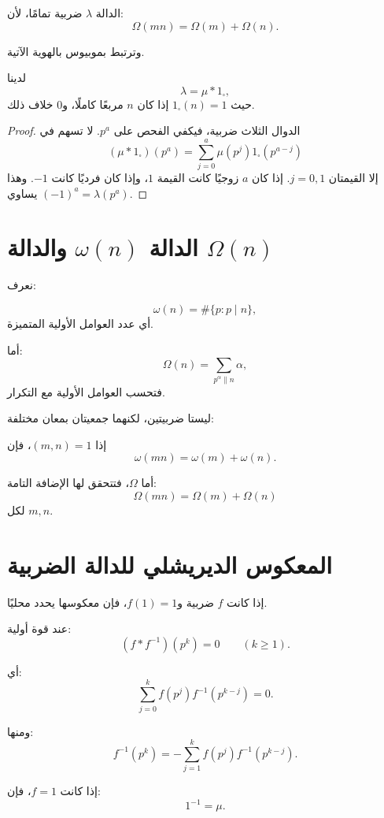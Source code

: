 الدالة \(\lambda\) ضربية تمامًا، لأن:
\[
\Omega(mn)=\Omega(m)+\Omega(n).
\]

وترتبط بموبيوس بالهوية الآتية.

\begin{proposition}
\label{prop:liouville-mobius-square}
\provedhere
لدينا
\[
\lambda
=
\mu*1_{\square},
\]
حيث \(1_{\square}(n)=1\) إذا كان \(n\) مربعًا كاملًا، و\(0\) خلاف ذلك.
\end{proposition}

\begin{proof}
الدوال الثلاث ضربية، فيكفي الفحص على \(p^a\). لا تسهم في
\[
(\mu*1_{\square})(p^a)
=
\sum_{j=0}^{a}\mu(p^j)1_{\square}(p^{a-j})
\]
إلا القيمتان \(j=0,1\). إذا كان \(a\) زوجيًا كانت القيمة \(1\)،
وإذا كان فرديًا كانت \(-1\). وهذا يساوي \((-1)^a=\lambda(p^a)\).
\end{proof}

\section{الدالة \(\omega(n)\) والدالة \(\Omega(n)\)}

نعرف:

\[
\omega(n)=\#\{p:p\mid n\},
\]
أي عدد العوامل الأولية المتميزة.

أما:
\[
\Omega(n)=\sum_{p^\alpha\parallel n}\alpha,
\]
فتحسب العوامل الأولية مع التكرار.

ليستا ضربيتين، لكنهما جمعيتان بمعان مختلفة:

إذا \((m,n)=1\)، فإن
\[
\omega(mn)=\omega(m)+\omega(n).
\]

أما \(\Omega\)، فتتحقق لها الإضافة التامة:
\[
\Omega(mn)=\Omega(m)+\Omega(n)
\]
لكل \(m,n\).

\section{المعكوس الديريشلي للدالة الضربية}

إذا كانت \(f\) ضربية و\(f(1)=1\)، فإن معكوسها يحدد محليًا.

عند قوة أولية:
\[
(f*f^{-1})(p^k)=0
\qquad(k\geq1).
\]

أي:
\[
\sum_{j=0}^{k}
f(p^j)f^{-1}(p^{k-j})=0.
\]

ومنها:
\[
f^{-1}(p^k)
=
-\sum_{j=1}^{k}
f(p^j)f^{-1}(p^{k-j}).
\]

\begin{example}
إذا كانت \(f=1\)، فإن:
\[
1^{-1}=\mu.
\]
\end{example}

